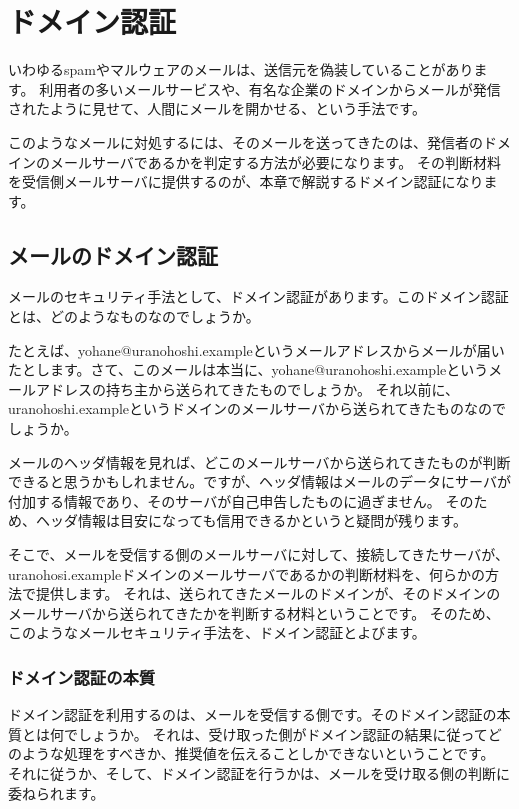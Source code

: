 \chapter{ドメイン認証}

いわゆるspamやマルウェアのメールは、送信元を偽装していることがあります。
利用者の多いメールサービスや、有名な企業のドメインからメールが発信されたように見せて、人間にメールを開かせる、という手法です。

このようなメールに対処するには、そのメールを送ってきたのは、発信者のドメインのメールサーバであるかを判定する方法が必要になります。
その判断材料を受信側メールサーバに提供するのが、本章で解説するドメイン認証になります。

\section{メールのドメイン認証}

メールのセキュリティ手法として、ドメイン認証があります。このドメイン認証とは、どのようなものなのでしょうか。

たとえば、yohane@uranohoshi.exampleというメールアドレスからメールが届いたとします。さて、このメールは本当に、yohane@uranohoshi.exampleというメールアドレスの持ち主から送られてきたものでしょうか。 それ以前に、uranohoshi.exampleというドメインのメールサーバから送られてきたものなのでしょうか。

メールのヘッダ情報を見れば、どこのメールサーバから送られてきたものが判断できると思うかもしれません。ですが、ヘッダ情報はメールのデータにサーバが付加する情報であり、そのサーバが自己申告したものに過ぎません。 そのため、ヘッダ情報は目安になっても信用できるかというと疑問が残ります。

そこで、メールを受信する側のメールサーバに対して、接続してきたサーバが、uranohosi.exampleドメインのメールサーバであるかの判断材料を、何らかの方法で提供します。 それは、送られてきたメールのドメインが、そのドメインのメールサーバから送られてきたかを判断する材料ということです。 そのため、このようなメールセキュリティ手法を、ドメイン認証とよびます。

\subsection{ドメイン認証の本質}

ドメイン認証を利用するのは、メールを受信する側です。そのドメイン認証の本質とは何でしょうか。 それは、受け取った側がドメイン認証の結果に従ってどのような処理をすべきか、推奨値を伝えることしかできないということです。 それに従うか、そして、ドメイン認証を行うかは、メールを受け取る側の判断に委ねられます。

